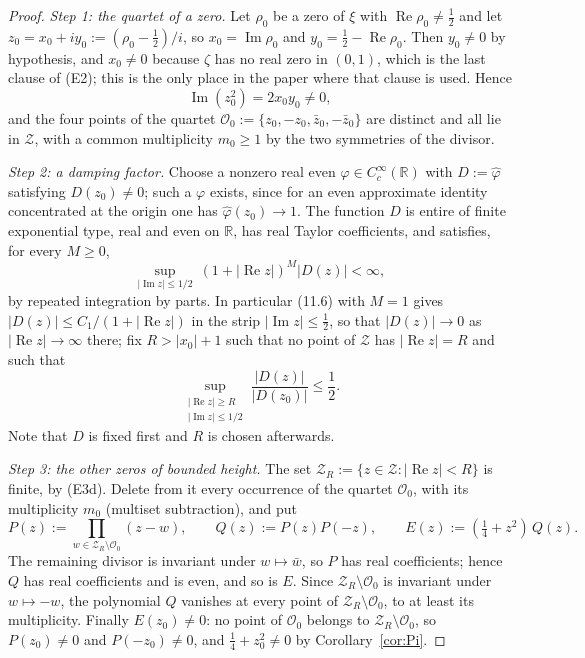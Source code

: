 \documentclass[11pt]{amsart}
\theoremstyle{definition}
\theoremstyle{remark}
\newcommand{\R}{\mathbb R}
\newcommand{\Rel}{\operatorname{Re}}
\newcommand{\Iml}{\operatorname{Im}}
\begin{document}
\begin{proof}
\emph{Step 1: the quartet of a zero.}  Let $\rho_0$ be a zero of $\xi$ with
$\Rel\rho_0\ne\tfrac12$ and let $z_0=x_0+iy_0:=(\rho_0-\tfrac12)/i$, so
$x_0=\Iml\rho_0$ and $y_0=\tfrac12-\Rel\rho_0$.  Then $y_0\ne0$ by hypothesis,
and $x_0\ne0$ because $\zeta$ has no real zero in $(0,1)$, which is the last
clause of (E2); this is the only place in the paper where that clause is used.
Hence
\begin{equation}
  \Iml(z_0^2)=2x_0y_0\ne0 ,
\tag{11.5}
\end{equation}
and the four points of the quartet
$\mathcal O_0:=\{z_0,-z_0,\bar z_0,-\bar z_0\}$ are distinct and all lie in
$\mathcal Z$, with a common multiplicity $m_0\ge1$ by the two symmetries of the
divisor.

\emph{Step 2: a damping factor.}  Choose a nonzero real even
$\varphi\in C_c^\infty(\R)$ with $D:=\hat\varphi$ satisfying $D(z_0)\ne0$; such
a $\varphi$ exists, since for an even approximate identity concentrated at the
origin one has $\hat\varphi(z_0)\to1$.  The function $D$ is entire of finite
exponential type, real and even on $\R$, has real Taylor coefficients, and
satisfies, for every $M\ge0$,
\begin{equation}
  \sup_{|\Iml z|\le1/2}\ (1+|\Rel z|)^M|D(z)|<\infty ,
\tag{11.6}
\end{equation}
by repeated integration by parts.  In particular (11.6) with $M=1$ gives
$|D(z)|\le C_1/(1+|\Rel z|)$ in the strip $|\Iml z|\le\tfrac12$, so that
$|D(z)|\to0$ as $|\Rel z|\to\infty$ there; fix $R>|x_0|+1$ such that no point
of $\mathcal Z$ has $|\Rel z|=R$ and such that
\begin{equation}
  \sup_{\substack{|\Rel z|\ge R\\ |\Iml z|\le1/2}}
     \frac{|D(z)|}{|D(z_0)|}\le\frac12 .
\tag{11.7}
\end{equation}
Note that $D$ is fixed first and $R$ is chosen afterwards.

\emph{Step 3: the other zeros of bounded height.}  The set
$\mathcal Z_R:=\{z\in\mathcal Z:|\Rel z|<R\}$ is finite, by (E3d).  Delete from
it every occurrence of the quartet $\mathcal O_0$, with its multiplicity $m_0$
(multiset subtraction), and put
\[
  P(z):=\prod_{w\in\mathcal Z_R\setminus\mathcal O_0}(z-w),
  \qquad
  Q(z):=P(z)P(-z),
  \qquad
  E(z):=(\tfrac14+z^2)\,Q(z).
\]
The remaining divisor is invariant under $w\mapsto\bar w$, so $P$ has real
coefficients; hence $Q$ has real coefficients and is even, and so is $E$.
Since $\mathcal Z_R\setminus\mathcal O_0$ is invariant under $w\mapsto-w$, the
polynomial $Q$ vanishes at every point of $\mathcal Z_R\setminus\mathcal O_0$,
to at least its multiplicity.  Finally $E(z_0)\ne0$: no point of
$\mathcal O_0$ belongs to $\mathcal Z_R\setminus\mathcal O_0$, so
$P(z_0)\ne0$ and $P(-z_0)\ne0$, and $\tfrac14+z_0^2\ne0$ by
Corollary~\ref{cor:Pi}.


\end{proof}
\end{document}
